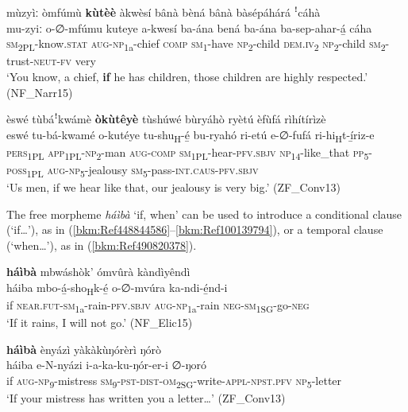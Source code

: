 \ea
\label{bkm:Ref99108051}
mùzyìː òmfúmù \textbf{kùtèè} àkwèsí bânà bèná bânà bàsépáhárá ꜝcáhà\\
\gll mu-zyiː    o-∅-mfúmu    kuteye    a-kwesí  ba-ána bená    ba-ána  ba-sep-ahar-á̲  cáha\\
\textsc{sm}\textsubscript{2PL}-know.\textsc{stat}  \textsc{aug}-\textsc{np}\textsubscript{1a}-chief  \textsc{comp}    \textsc{sm}\textsubscript{1}-have  \textsc{np}\textsubscript{2}-child
\textsc{dem}.\textsc{iv}\textsubscript{2}  \textsc{np}\textsubscript{2}-child  \textsc{sm}\textsubscript{2}-trust-\textsc{neut}-\textsc{fv}   very\\
\glt ‘You know, a chief, \textbf{if} he has children, those children are highly respected.’ (NF\_Narr15)
\z

\ea
\label{bkm:Ref99108052}
èswé tùbáꜝkwámè \textbf{òkùtêyè} tùshúwé bùryáhò ryètú èfùfá rìhítírìzè\\
\gll eswé    tu-bá-kwamé  o-kutéye  tu-shu\textsubscript{H}-é̲     bu-ryahó   ri-etú    e-∅-fufá    ri-hi\textsubscript{H}t-í̲riz-e\\
\textsc{pers}\textsubscript{1PL}  \textsc{app}\textsubscript{1PL}-\textsc{np}\textsubscript{2}-man  \textsc{aug}-\textsc{comp}  \textsc{sm}\textsubscript{1PL}-hear-\textsc{pfv}.\textsc{sbjv} 
\textsc{np}\textsubscript{14}-like\_that \textsc{pp}\textsubscript{5}-\textsc{poss}\textsubscript{1PL}  \textsc{aug}-\textsc{np}\textsubscript{5}-jealousy  \textsc{sm}\textsubscript{5}-pass-\textsc{int}.\textsc{caus}-\textsc{pfv}.\textsc{sbjv}\\
\glt ‘Us men, if we hear like that, our jealousy is very big.’ (ZF\_Conv13)
\z

The free morpheme \textit{háìbà} ‘if, when’ can be used to introduce a conditional clause (‘if…’), as in (\ref{bkm:Ref448844586}--\ref{bkm:Ref100139794}), or a temporal clause (‘when…’), as in (\ref{bkm:Ref490820378}).

\ea
\label{bkm:Ref448844586}
\label{bkm:Ref71274435}
\textbf{háìbà} mbwáshòk’ ómvûrà kàndìyêndì\\
\gll háiba  mbo-á̲-sho\textsubscript{H}k-é̲      o-∅-mvúra    ka-ndi-é̲nd-i\\
if  \textsc{near}.\textsc{fut}-\textsc{sm}\textsubscript{1a}-rain-\textsc{pfv}.\textsc{sbjv}  \textsc{aug}-\textsc{np}\textsubscript{1a}-rain  \textsc{neg}-\textsc{sm}\textsubscript{1SG}-go-\textsc{neg}\\
\glt ‘If it rains, I will not go.’ (NF\_Elic15)
\z

\ea
\label{bkm:Ref100139794}
\textbf{háìbà} ènyázì yàkàkùŋórèrì ŋórò\\
\gll háiba  e-N-nyázi    i-a-ka-ku-ŋór-er-i ∅-ŋoró\\
if  \textsc{aug}-\textsc{np}\textsubscript{9}-mistress  \textsc{sm}\textsubscript{9}-\textsc{pst}-\textsc{dist}-\textsc{om}\textsubscript{2SG}-write-\textsc{appl}-\textsc{npst}.\textsc{pfv}
\textsc{np}\textsubscript{5}-letter\\
\glt ‘If your mistress has written you a letter…’ (ZF\_Conv13)
\z

